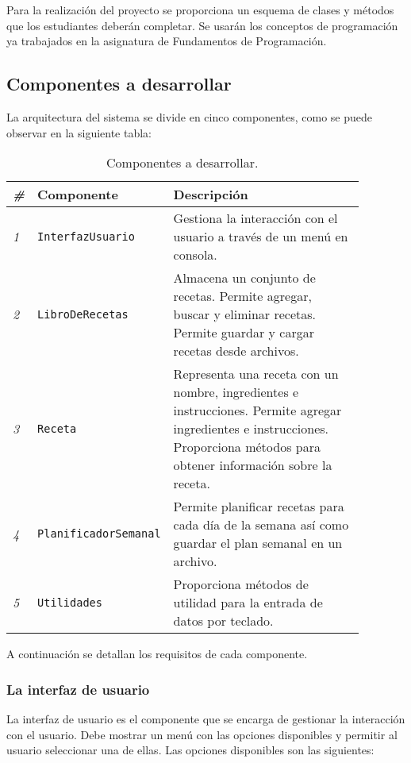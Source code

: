 \documentclass[
    a4paper, %
    12pt, %
]{CSSullivanBusinessReport}
\begin{document}
Para la realización del proyecto se proporciona un esquema de clases y métodos que los estudiantes deberán completar. Se usarán los conceptos de programación ya trabajados en la asignatura de Fundamentos de Programación.

\subsection{Componentes a desarrollar}
La arquitectura del sistema se divide en cinco componentes, como se puede observar en la siguiente tabla:

\begin{table*} %
    \caption{Componentes a desarrollar.}
    \begin{tabular}{C{0.03\linewidth} L{0.3\linewidth} L{0.55\linewidth}}
        \toprule
        \textit{\#} & \textbf{Componente} & \textbf{Descripción} \\
        \midrule
        \textit{1} & \texttt{InterfazUsuario} & Gestiona la interacción con el usuario a través de un menú en consola.\\
        \textit{2} & \texttt{LibroDeRecetas} & Almacena un conjunto de recetas. Permite agregar, buscar y eliminar recetas. Permite guardar y cargar recetas desde archivos.\\
        \textit{3} & \texttt{Receta} & Representa una receta con un nombre, ingredientes e instrucciones. Permite agregar ingredientes e instrucciones. Proporciona métodos para obtener información sobre la receta.\\
        \textit{4} & \texttt{PlanificadorSemanal} & Permite planificar recetas para cada día de la semana así como guardar el plan semanal en un archivo.\\
        \textit{5} & \texttt{Utilidades} & Proporciona métodos de utilidad para la entrada de datos por teclado.\\
        \bottomrule
    \end{tabular}
\end{table*}

A continuación se detallan los requisitos de cada componente.

\subsubsection{La interfaz de usuario}\label{sec:interfaz-usuario}
La interfaz de usuario es el componente que se encarga de gestionar la interacción con el usuario. Debe mostrar un menú con las opciones disponibles y permitir al usuario seleccionar una de ellas. Las opciones disponibles son las siguientes:
\end{document}
